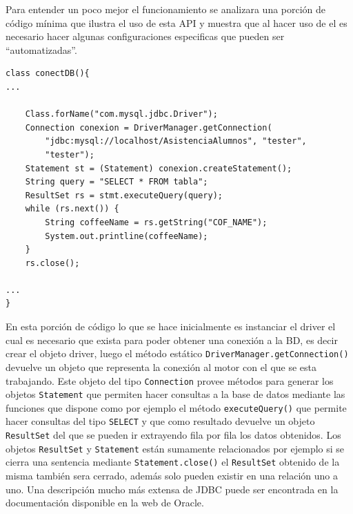 Para entender un poco mejor el funcionamiento se analizara una porción de código mínima que ilustra el uso de esta API y muestra que al hacer uso de el es necesario hacer algunas configuraciones especificas que pueden ser ``automatizadas''.
%
\begin{lstlisting}[title=Porción de código java para la conexión a una base de datos]
class conectDB(){
...

	Class.forName("com.mysql.jdbc.Driver");
	Connection conexion = DriverManager.getConnection(
		"jdbc:mysql://localhost/AsistenciaAlumnos", "tester",
		"tester");
	Statement st = (Statement) conexion.createStatement();
	String query = "SELECT * FROM tabla";
	ResultSet rs = stmt.executeQuery(query);
	while (rs.next()) {
		String coffeeName = rs.getString("COF_NAME");
		System.out.printline(coffeeName);
	}
	rs.close();

...
}
\end{lstlisting}

En esta porción de código lo que se hace inicialmente es instanciar el driver el cual es necesario que exista para poder obtener una conexión a la BD, es decir crear el objeto driver, luego el método estático \verb=DriverManager.getConnection()= devuelve un objeto que representa la conexión al motor con el que se esta trabajando. Este objeto del tipo \verb=Connection= provee métodos para generar los objetos \verb=Statement= que   permiten hacer consultas a la base de datos mediante las funciones que dispone como por ejemplo el método \verb=executeQuery()= que permite hacer consultas del tipo \verb=SELECT= y que como resultado devuelve un objeto \verb=ResultSet= del que se pueden ir extrayendo fila por fila los datos obtenidos. Los objetos \verb=ResultSet= y \verb=Statement= están sumamente relacionados por ejemplo si se cierra una sentencia mediante \verb=Statement.close()= el \verb=ResultSet= obtenido de la misma también sera cerrado, además solo pueden existir en una relación uno a uno. Una descripción mucho más extensa de JDBC puede ser encontrada en la documentación disponible en la web de Oracle\citep{java:jdbc}.
%
